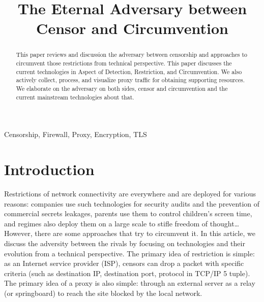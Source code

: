 \documentclass[conference]{IEEEtran}
\begin{document}
\title{The Eternal Adversary between Censor and Circumvention}
\footnotesize

\author{
}
\maketitle

\begin{abstract}
This paper reviews and discussion the adversary between censorship and approaches to circumvent those restrictions from technical perspective. This paper discusses the current technologies in Aspect of Detection, Restriction, and Circumvention. We also actively collect, process, and visualize proxy traffic for obtaining supporting resources. We elaborate on the adversary on both sides, censor and circumvention and the current mainstream technologies about that.
\end{abstract}

\begin{IEEEkeywords}
Censorship, Firewall, Proxy, Encryption, TLS
\end{IEEEkeywords}

\section{Introduction}
Restrictions of network connectivity are everywhere and are deployed for various reasons: companies use such technologies for security audits and the prevention of commercial secrets leakages, parents use them to control children's screen time, and regimes also deploy them on a large scale to stifle freedom of thought… However, there are some approaches that try to circumvent it. In this article, we discuss the adversity between the rivals by focusing on technologies and their evolution from a technical perspective.
The primary idea of restriction is simple: as an Internet service provider (ISP), censors can drop a packet with specific criteria (such as destination IP, destination port, protocol in TCP/IP 5 tuple).
The primary idea of a proxy is also simple: through an external server as a relay (or springboard) to reach the site blocked by the local network.
\end{document}
